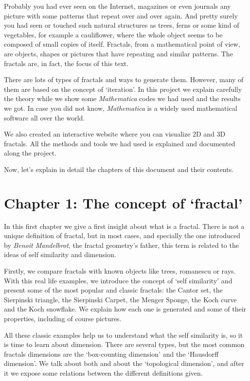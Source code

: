 
Probably you had ever seen on the Internet, magazines or even journals any picture with some patterns that repeat over and over again. And pretty surely you had seen or touched such natural structures as trees, ferns or some kind of vegetables, for example a cauliflower, where the whole object seems to be composed of small copies of itself. Fractals, from a mathematical point of view, are objects, shapes or pictures that have repeating and similar patterns. The fractals are, in fact, the focus of this text.

There are lots of types of fractals and ways to generate them. However, many of them are based on the concept of `iteration'. In this project we explain carefully the theory while we show some \textit{Mathematica} codes we had used and the results we got. In case you did not know, \textit{Mathematica} is a widely used mathematical software all over the world. 

We also created an interactive website where you can visualize 2D and 3D fractals. All the methods and tools we had used is explained and documented along the project.

Now, let's explain in detail the chapters of this document and their contents.

\section*{Chapter 1: The concept of `fractal'}

In this first chapter we give a first insight about what is a fractal. There is not a unique definition of fractal, but in most cases, and specially the one introduced by \textit{Benoit Mandelbrot}, the fractal geometry's father, this term is related to the ideas of self similarity and dimension. 

Firstly, we compare fractals with known objects like trees, romanescu or rays. With this real life examples, we introduce the concept of `self similarity' and present some of the most popular and classic fractals: the Cantor set, the Sierpinski triangle, the Sierpinski Carpet, the Menger Sponge, the Koch curve and the Koch snowflake. We explain how each one is generated and some of their properties, including of course pictures.

All these classic examples help us to understand what the self similarity is, so it is time to learn about dimension. There are several types, but the most common fractals dimensions are the `box-counting dimension' and the `Hausdorff dimension'. We talk about both and about the `topological dimension', and after it we expose some relations between the different definitions given.

